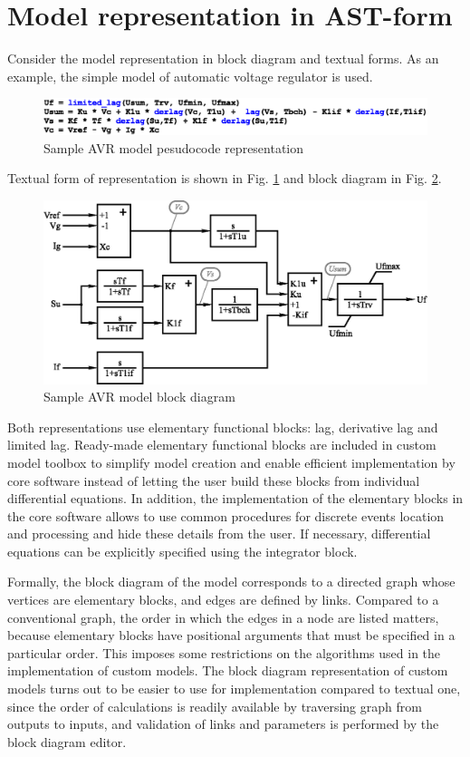 \documentclass[lettersize,journal]{IEEEtran}
\begin{document}
\section{Model representation in AST-form}
Consider the model representation in block diagram and textual forms. As an example, the simple model of automatic voltage regulator is used. 
\begin{figure}[h]
	\centering
	\includegraphics[width=\columnwidth]{code.eps}
	\caption{Sample AVR model pesudocode representation}
	\label{fig_avrcode}
\end{figure}
Textual form of representation is shown in Fig. \ref{fig_avrcode} and block diagram in Fig. \ref{fig_avr}.
\begin{figure}[h]
	\centering
	\includegraphics[width=\columnwidth]{avr.eps}
	\caption{Sample AVR model block diagram}
	\label{fig_avr}
\end{figure}

Both representations use elementary functional blocks: lag, derivative lag and limited lag. Ready-made elementary functional
blocks are included in custom model toolbox to simplify model creation and enable efficient implementation by core software
instead of letting the user build these blocks from individual differential equations.
In addition, the implementation of the elementary blocks in the core software allows to use common procedures for discrete events 
location and processing and hide these details from the user. 
If necessary, differential equations can be explicitly specified using the integrator block.

Formally, the block diagram of the model corresponds to a directed graph whose vertices are elementary blocks, and
edges are defined by links. Compared to a conventional graph, the order in which the edges in a node are listed matters,
because elementary blocks have positional arguments that must be specified in a particular order. This imposes some restrictions
on the algorithms used in the implementation of custom models. The block diagram representation of custom models
turns out to be easier to use for implementation compared to textual one, since the order of calculations is readily
available by traversing graph from outputs to inputs, and validation of links and parameters is performed by the 
block diagram editor.
\end{document}
